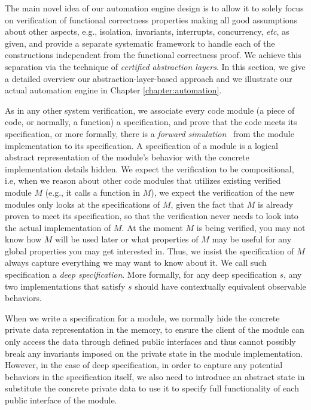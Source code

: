 
The main novel idea of our automation engine design is to allow it to solely focus on verification
of functional correctness properties making all good assumptions about other aspects,
e.g., isolation, invariants, interrupts, concurrency, {\it etc}, as given, and provide
a separate systematic framework to handle each of the constructions independent from the functional correctness proof.
We achieve this separation via the technique of \emph{certified abstraction layers}.
In this section, we give a detailed overview our abstraction-layer-based
approach and we illustrate our actual automation engine in Chapter \ref{chapter:automation}.

As in any other system verification, we associate every code module (a piece of code,
or normally, a function)
a specification, and prove that the code meets its specification, or more
formally, there is a {\em forward simulation}~\cite{Lynch95} from the module
implementation to its specification. A specification of a module is a logical
abstract representation of the module's behavior with the concrete
implementation details hidden. We expect the verification to be compositional,
i.e, when we reason about other code modules that utilizes existing verified
module $M$ (e.g., it calls a function in $M$), we expect the verification
of the new modules only looks at the specifications of $M$, given the fact
that $M$ is already proven to meet its specification, so that the verification
never needs to look into the actual implementation of $M$. At the moment $M$ is
being verified, you may not know how $M$ will be used later or what properties of
$M$ may be useful for any global properties you may get interested in.
Thus, we insist the specification of $M$ always capture everything
we may want to know about it. We call such specification a {\em deep specification}.
More formally, for any deep specification $s$, any two implementations that satisfy $s$
should have contextually equivalent observable behaviors. 

When we write a specification for a module, we normally hide the
concrete private data representation in the memory, to ensure the client
of the module can only access the data through defined public interfaces
and thus cannot possibly break any invariants imposed on the private
state in the module implementation. However, in the case of deep
specification, in order to capture any potential behaviors in the
specification itself, we also need to introduce an abstract state
in substitute the concrete private data to use it to specify
full functionality of each public interface of the module.

